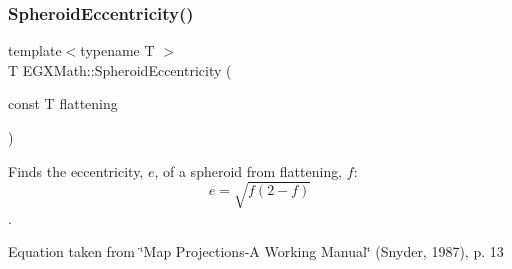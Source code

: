 \subsubsection{\texorpdfstring{Spheroid\+Eccentricity()}{SpheroidEccentricity()}\hspace{0.1cm}{\footnotesize\ttfamily [1/2]}}
{\footnotesize\ttfamily template$<$typename T $>$ \\
T E\+G\+X\+Math\+::\+Spheroid\+Eccentricity (\begin{DoxyParamCaption}\item[{const T}]{flattening }\end{DoxyParamCaption})}



Finds the eccentricity, $e$, of a spheroid from flattening, $f$\+: \[ e = \sqrt{f (2 - f)} \]. 

Equation taken from \char`\"{}\+Map Projections-\/\+A Working Manual\char`\"{} (Snyder, 1987), p. 13

